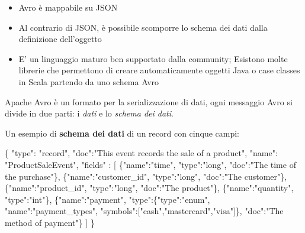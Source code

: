 \documentclass[]{article}
\newenvironment{Shaded}{}{}
\newcommand{\DataTypeTok}[1]{\textcolor[rgb]{0.56,0.13,0.00}{#1}}
\newcommand{\StringTok}[1]{\textcolor[rgb]{0.25,0.44,0.63}{#1}}
\newcommand{\OtherTok}[1]{\textcolor[rgb]{0.00,0.44,0.13}{#1}}
\newcommand{\FunctionTok}[1]{\textcolor[rgb]{0.02,0.16,0.49}{#1}}
\providecommand{\tightlist}{%
  \setlength{\itemsep}{0pt}\setlength{\parskip}{0pt}}
\begin{document}
\begin{itemize}
\tightlist
\item
  Avro è mappabile su JSON
\item
  Al contrario di JSON, è possibile scomporre lo schema dei dati dalla
  definizione dell'oggetto
\item
  E' un linguaggio maturo ben supportato dalla community; Esistono molte
  librerie che permettono di creare automaticamente oggetti Java o case
  classes in Scala partendo da uno schema Avro
\end{itemize}

Apache Avro è un formato per la serializzazione di dati, ogni messaggio
Avro si divide in due parti: i \emph{dati} e lo \emph{schema dei dati}.

Un esempio di \textbf{schema dei dati} di un record con cinque campi:
\small

\begin{Shaded}
\begin{Highlighting}[]
\FunctionTok{\{}
  \DataTypeTok{"type"}\FunctionTok{:} \StringTok{"record"}\FunctionTok{,}
  \DataTypeTok{"doc"}\FunctionTok{:}\StringTok{"This event records the sale of a product"}\FunctionTok{,}
  \DataTypeTok{"name"}\FunctionTok{:} \StringTok{"ProductSaleEvent"}\FunctionTok{,}
  \DataTypeTok{"fields"} \FunctionTok{:} \OtherTok{[}
    \FunctionTok{\{}\DataTypeTok{"name"}\FunctionTok{:}\StringTok{"time"}\FunctionTok{,} \DataTypeTok{"type"}\FunctionTok{:}\StringTok{"long"}\FunctionTok{,} \DataTypeTok{"doc"}\FunctionTok{:}\StringTok{"The time of the purchase"}\FunctionTok{\}}\OtherTok{,}
    \FunctionTok{\{}\DataTypeTok{"name"}\FunctionTok{:}\StringTok{"customer_id"}\FunctionTok{,} \DataTypeTok{"type"}\FunctionTok{:}\StringTok{"long"}\FunctionTok{,} \DataTypeTok{"doc"}\FunctionTok{:}\StringTok{"The customer"}\FunctionTok{\}}\OtherTok{,}
    \FunctionTok{\{}\DataTypeTok{"name"}\FunctionTok{:}\StringTok{"product_id"}\FunctionTok{,} \DataTypeTok{"type"}\FunctionTok{:}\StringTok{"long"}\FunctionTok{,} \DataTypeTok{"doc"}\FunctionTok{:}\StringTok{"The product"}\FunctionTok{\}}\OtherTok{,}
    \FunctionTok{\{}\DataTypeTok{"name"}\FunctionTok{:}\StringTok{"quantity"}\FunctionTok{,} \DataTypeTok{"type"}\FunctionTok{:}\StringTok{"int"}\FunctionTok{\}}\OtherTok{,}
    \FunctionTok{\{}\DataTypeTok{"name"}\FunctionTok{:}\StringTok{"payment"}\FunctionTok{,}
        \DataTypeTok{"type"}\FunctionTok{:\{}\DataTypeTok{"type"}\FunctionTok{:}\StringTok{"enum"}\FunctionTok{,}
            \DataTypeTok{"name"}\FunctionTok{:}\StringTok{"payment_types"}\FunctionTok{,}
                \DataTypeTok{"symbols"}\FunctionTok{:}\OtherTok{[}\StringTok{"cash"}\OtherTok{,}\StringTok{"mastercard"}\OtherTok{,}\StringTok{"visa"}\OtherTok{]}\FunctionTok{\},}
        \DataTypeTok{"doc"}\FunctionTok{:}\StringTok{"The method of payment"}\FunctionTok{\}}
  \OtherTok{]}
\FunctionTok{\}}
\end{Highlighting}
\end{Shaded}
\end{document}
